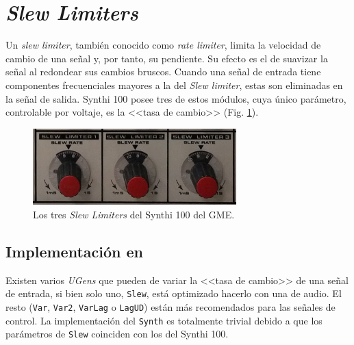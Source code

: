 \section[Slew Limiters]{\textit{Slew Limiters}}
\label{sec:slew_limiters}

Un \textit{slew limiter}, también conocido como \textit{rate limiter}, limita la velocidad de cambio de una señal y, por tanto, su pendiente. Su efecto es el de suavizar la señal al redondear sus cambios bruscos. Cuando una señal de entrada tiene componentes frecuenciales mayores a la del \textit{Slew limiter}, estas son eliminadas en la señal de salida. Synthi 100 posee tres de estos módulos, cuya único parámetro, controlable por voltaje, es la <<tasa de cambio>> (Fig. \ref{fig:slew_limiters}). 

\begin{figure}
	\centering
	\includegraphics[width=0.7\textwidth]{images/slew_limiters}
	\caption[\textit{Slew Limiters}]{Los tres \textit{Slew Limiters} del Synthi 100 del GME.}
	\label{fig:slew_limiters}
\end{figure}

\subsection{Implementación en \appName}
Existen varios \textit{UGens} que pueden de variar la <<tasa de cambio>> de una señal de entrada, si bien solo uno, \texttt{Slew}, está optimizado hacerlo con una de audio. El resto (\texttt{Var}, \texttt{Var2}, \texttt{VarLag} o \texttt{LagUD}) están más recomendados para las señales de control. La implementación del \texttt{Synth} es totalmente trivial debido a que los parámetros de \texttt{Slew} coinciden con los del Synthi 100. 